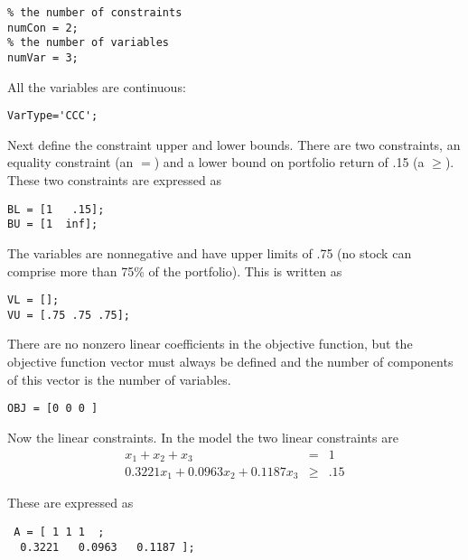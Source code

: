 \begin{verbatim}
% the number of constraints
numCon = 2;
% the number of variables
numVar = 3;
\end{verbatim}



All the variables are continuous:


\begin{verbatim}
VarType='CCC';
\end{verbatim}


Next define the constraint upper and lower bounds. There are two constraints, an equality  constraint (an $=$) and a lower bound on portfolio return of .15 (a $\ge$). These two constraints are expressed as



\begin{verbatim}
BL = [1   .15];
BU = [1  inf];
\end{verbatim}



The variables are nonnegative and have upper limits of .75 (no stock can comprise more than 75\% of the portfolio).  This is written as




\begin{verbatim}
VL = [];
VU = [.75 .75 .75];
\end{verbatim}



There are no nonzero linear coefficients in the objective function, but the objective function vector must always be defined and the number of components of this vector is the number of variables.



\begin{verbatim}
OBJ = [0 0 0 ]
\end{verbatim}


 Now the linear constraints.   In the model the two linear constraints are
 \begin{eqnarray*}
 x_{1} + x_{2} + x_{3} &=& 1 \\
 0.3221 x_{1} +   0.0963x_{2} +    0.1187x_{3}  &\ge& .15
 \end{eqnarray*}



 These are expressed as



 \begin{verbatim}
 A = [ 1 1 1  ;
  0.3221   0.0963   0.1187 ];
 \end{verbatim}


